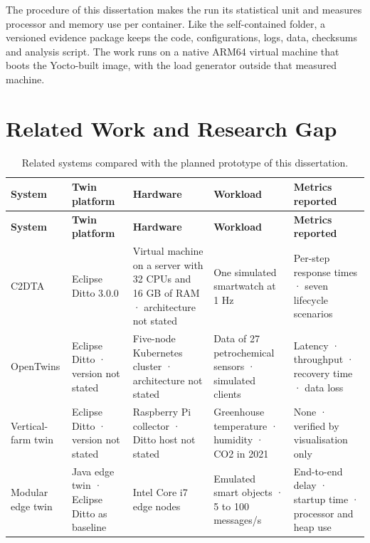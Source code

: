 The procedure of this dissertation makes the run its statistical unit and measures processor and memory use per container. Like the self-contained folder, a versioned evidence package keeps the code, configurations, logs, data, checksums and analysis script. The work runs on a native ARM64 virtual machine that boots the Yocto-built image, with the load generator outside that measured machine.

\section{Related Work and Research Gap}\label{related-work-and-research-gap}

\begingroup
\small{}
\begin{longtable}{@{}>{\RaggedRight\arraybackslash}p{}>{\RaggedRight\arraybackslash}p{}>{\RaggedRight\arraybackslash}p{}>{\RaggedRight\arraybackslash}p{}>{\RaggedRight\arraybackslash}p{}@{}}
\caption{Related systems compared with the planned prototype of this dissertation.}\label{tab:related-systems}\\
\toprule
\textbf{System} & \textbf{Twin platform} & \textbf{Hardware} & \textbf{Workload} & \textbf{Metrics reported} \\
\midrule\endfirsthead
\toprule
\textbf{System} & \textbf{Twin platform} & \textbf{Hardware} & \textbf{Workload} & \textbf{Metrics reported} \\
\midrule\endhead
\bottomrule\endfoot
C2DTA \cite{word06} & Eclipse Ditto 3.0.0 & Virtual machine on a server with 32 CPUs and 16 GB of RAM · architecture not stated & One simulated smartwatch at 1 Hz & Per-step response times · seven lifecycle scenarios \\
\addlinespace[3pt]
OpenTwins \cite{word30} & Eclipse Ditto · version not stated & Five-node Kubernetes cluster · architecture not stated & Data of 27 petrochemical sensors · simulated clients & Latency · throughput · recovery time · data loss \\
\addlinespace[3pt]
Vertical-farm twin \cite{word31} & Eclipse Ditto · version not stated & Raspberry Pi collector · Ditto host not stated & Greenhouse temperature · humidity · CO2 in 2021 & None · verified by visualisation only \\
\addlinespace[3pt]
Modular edge twin \cite{word32} & Java edge twin · Eclipse Ditto as baseline & Intel Core i7 edge nodes & Emulated smart objects · 5 to 100 messages/s & End-to-end delay · startup time · processor and heap use \\

\end{longtable}
